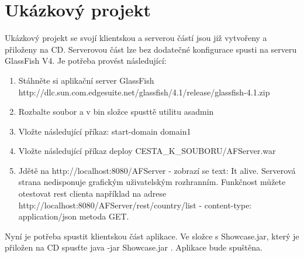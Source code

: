 \section{Ukázkový projekt}
Ukázkový projekt se svojí klientskou a serverou částí jsou již vytvořeny a přiloženy na CD. Serverovou část lze bez dodatečné konfigurace spusti na serveru GlassFish V4. Je potřeba provést následující:
\begin{enumerate}
\item Stáhněte si aplikační server GlassFish http://dlc.sun.com.edgesuite.net/glassfish/4.1/release/glassfish-4.1.zip
\item Rozbalte soubor a v bin složce spusttě utilitu asadmin
\item Vložte následující příkaz: start-domain domain1
\item Vložte následující příkaz deploy CESTA_K_SOUBORU/AFServer.war
\item Jdětě na http://localhost:8080/AFServer - zobrazí se text: It alive. Serverová strana nedisponuje grafickým uživatelským rozhranním. Funkčnost můžete otestovat rest clienta například na adrese http://localhost:8080/AFServer/rest/country/list - content-type: application/json metoda GET.
\end{enumerate}
Nyní je potřeba spustit klientskou část aplikace. Ve složce s Showcase.jar, který je přiložen na CD spusťte java -jar Showcase.jar . Aplikace bude spuštěna.

